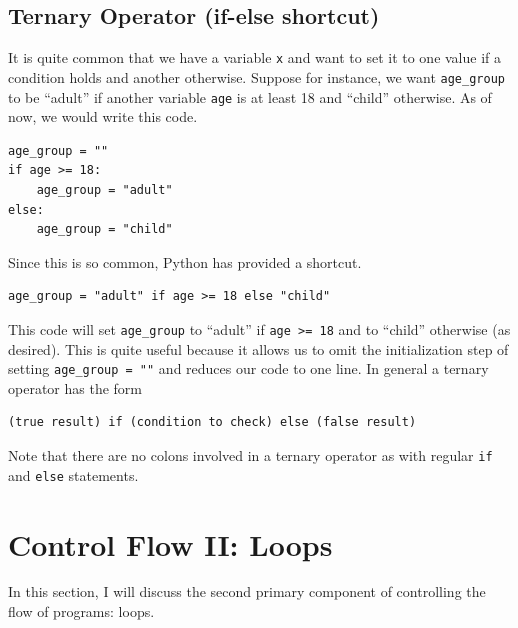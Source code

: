 \documentclass{article}
\begin{document}
\subsection{Ternary Operator (if-else shortcut)}
It is quite common that we have a variable \texttt{x} and want to set it to one value if a condition holds and another otherwise. Suppose for instance, we want \texttt{age\_group} to be ``adult'' if another variable \texttt{age} is at least 18 and ``child'' otherwise. As of now, we would write this code.
\begin{verbatim}
age_group = ""
if age >= 18:
    age_group = "adult"
else:
    age_group = "child"
\end{verbatim}
Since this is so common, Python has provided a shortcut.
\begin{verbatim}
age_group = "adult" if age >= 18 else "child"
\end{verbatim}
This code will set \texttt{age\_group} to ``adult'' if \texttt{age >= 18} and to ``child'' otherwise (as desired). This is quite useful because it allows us to omit the initialization step of setting \texttt{age\_group = ""} and reduces our code to one line. In general a ternary operator has the form
\begin{verbatim}
(true result) if (condition to check) else (false result)
\end{verbatim}
Note that there are no colons involved in a ternary operator as with regular \texttt{if} and \texttt{else} statements.

\section{Control Flow II: Loops}
In this section, I will discuss the second primary component of controlling the flow of programs: loops. 
\end{document}

